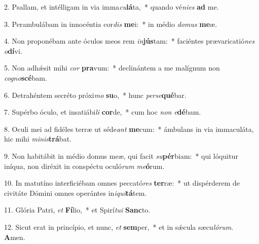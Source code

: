 2. Psallam, et intélligam in via imma\textit{cu}\textbf{lá}ta,~*  quando vé\textit{ni}\textit{es} \textbf{ad} me.\

3. Perambulábam in innocéntia cor\textit{dis} \textbf{me}i:~*  in médio \textit{do}\textit{mus} \textbf{me}æ.\

4. Non proponébam ante óculos meos rem \textit{in}\textbf{jús}tam:~*  faciéntes prævaricatió\textit{nes} \textit{o}\textbf{dí}vi.\

5. Non adhǽsit mihi \textit{cor} \textbf{pra}vum:~*  declinántem a me malígnum non \textit{co}\textit{gno}\textbf{scé}bam.\

6. Detrahéntem secréto próxi\textit{mo} \textbf{su}o,~*  hunc \textit{per}\textit{se}\textbf{qué}bar.\

7. Supérbo óculo, et insatiábi\textit{li} \textbf{cor}de,~*  cum hoc \textit{non} \textit{e}\textbf{dé}bam.\

8. Oculi mei ad fidéles terræ ut séde\textit{ant} \textbf{me}cum:~*  ámbulans in via immaculáta, hic mihi \textit{mi}\textit{nis}\textbf{trá}bat.\

9. Non habitábit in médio domus meæ, qui facit \textit{su}\textbf{pér}biam:~*  qui lóquitur iníqua, non diréxit in conspéctu oculó\textit{rum} \textit{me}\textbf{ó}rum.\

10. In matutíno interficiébam omnes peccató\textit{res} \textbf{ter}ræ:~*  ut dispérderem de civitáte Dómini omnes operántes in\textit{i}\textit{qui}\textbf{tá}tem.\

11. Glória Patri, \textit{et} \textbf{Fí}lio,~*  et Spirí\textit{tu}\textit{i} \textbf{Sanc}to.\

12. Sicut erat in princípio, et nunc, \textit{et} \textbf{sem}per,~*  et in sǽcula sæcu\textit{ló}\textit{rum}. \textbf{A}men.\

